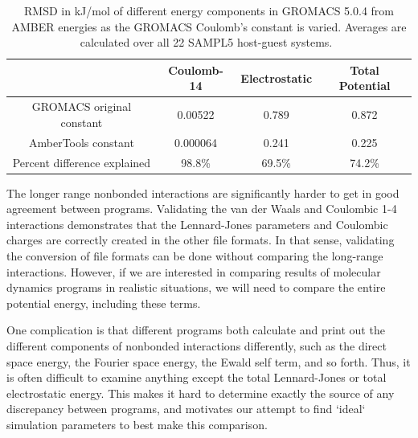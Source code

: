 \begin{table}
\caption{RMSD in kJ/mol of different energy components in GROMACS
  5.0.4 from AMBER energies as the GROMACS Coulomb's constant is
  varied. Averages are calculated over all 22 SAMPL5 host-guest
  systems.~\label{table:coulchange}}
\begin{center}
\begin{tabular}{|c|ccc|}
\hline
                          & Coulomb-14  & Electrostatic & Total Potential \\
\hline
GROMACS original constant &  0.00522    & 0.789         & 0.872  \\ 
AmberTools constant      &  0.000064   & 0.241         & 0.225 \\
Percent difference explained & 98.8\%   & 69.5\%        & 74.2\% \\  
\hline
\end{tabular}
\end{center}
\end{table}

The longer range nonbonded interactions are significantly harder to
get in good agreement between programs.  Validating the van der Waals
and Coulombic 1-4 interactions demonstrates that the Lennard-Jones
parameters and Coulombic charges are correctly created in the other
file formats.  In that sense, validating the conversion of file
formats can be done without comparing the long-range
interactions. However, if we are interested in comparing results of
molecular dynamics programs in realistic situations, we will need to
compare the entire potential energy, including these terms. 

One complication is that different programs both calculate and print
out the different components of nonbonded interactions differently,
such as the direct space energy, the Fourier space energy, the Ewald
self term, and so forth.  Thus, it is often difficult to examine
anything except the total Lennard-Jones or total electrostatic
energy. This makes it hard to determine exactly the source of any
discrepancy between programs, and motivates our attempt to find
`ideal` simulation parameters to best make this comparison.

